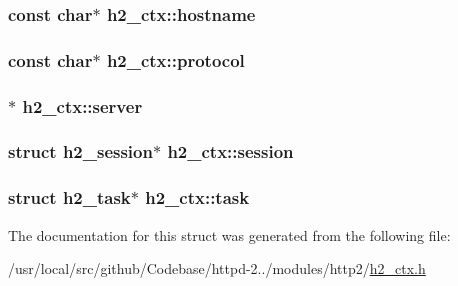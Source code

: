 \subsubsection[{\texorpdfstring{hostname}{hostname}}]{\setlength{\rightskip}{0pt plus 5cm}const char$\ast$ h2\+\_\+ctx\+::hostname}\hypertarget{structh2__ctx_a02b4b7d911c87acfa6e55c57bc98219e}{}\label{structh2__ctx_a02b4b7d911c87acfa6e55c57bc98219e}
\subsubsection[{\texorpdfstring{protocol}{protocol}}]{\setlength{\rightskip}{0pt plus 5cm}const char$\ast$ h2\+\_\+ctx\+::protocol}\hypertarget{structh2__ctx_a8c87b6069dd26c5f492101407167140b}{}\label{structh2__ctx_a8c87b6069dd26c5f492101407167140b}
\subsubsection[{\texorpdfstring{server}{server}}]{$\ast$ h2\+\_\+ctx\+::server}\hypertarget{structh2__ctx_a85fc866b766922f482b061aea2547021}{}\label{structh2__ctx_a85fc866b766922f482b061aea2547021}
\subsubsection[{\texorpdfstring{session}{session}}]{\setlength{\rightskip}{0pt plus 5cm}struct {\bf h2\+\_\+session}$\ast$ h2\+\_\+ctx\+::session}\hypertarget{structh2__ctx_ab308cfd9e795488a03d626077b4cdef4}{}\label{structh2__ctx_ab308cfd9e795488a03d626077b4cdef4}
\subsubsection[{\texorpdfstring{task}{task}}]{\setlength{\rightskip}{0pt plus 5cm}struct {\bf h2\+\_\+task}$\ast$ h2\+\_\+ctx\+::task}\hypertarget{structh2__ctx_a3b2dc67bcdbf942f8cd9aca09fa01552}{}\label{structh2__ctx_a3b2dc67bcdbf942f8cd9aca09fa01552}


The documentation for this struct was generated from the following file\+:\begin{DoxyCompactItemize}
\item 
/usr/local/src/github/\+Codebase/httpd-\/2../modules/http2/\hyperlink{h2__ctx_8h}{h2\+\_\+ctx.\+h}\end{DoxyCompactItemize}
